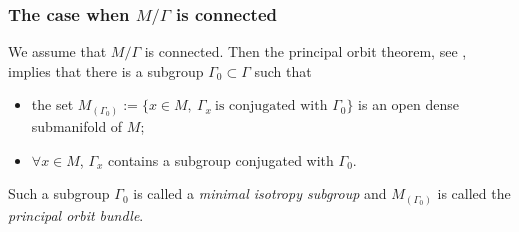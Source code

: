 \documentclass[11pt,a4paper]{amsart}
\newcommand\<{\langle}
\renewcommand\>{\rangle}
\theoremstyle{definition}
\begin{document}
\subsubsection*{The case when $M/\Gamma$ is connected} 

We assume that $M/\Gamma$ is connected. 
Then the principal orbit theorem, see \cite{Bredon,tomDieckTransBook}, implies that there is a subgroup  $\Gamma_0 \subset \Gamma$ such that 
\begin{itemize}
\item the set $M_{(\Gamma_0)}:=\{x \in M,\ \Gamma_x \ \mbox{is conjugated with } \Gamma_0\}$ is an open dense submanifold of $M$;
\item $\forall x\in M$, $\Gamma_x$ contains a subgroup conjugated with $\Gamma_0$.
\end{itemize}

Such a subgroup $\Gamma_0$ is called a \emph{minimal isotropy subgroup} 
and $M_{(\Gamma_0)}$ is called the \emph{principal orbit bundle}.
\end{document}
